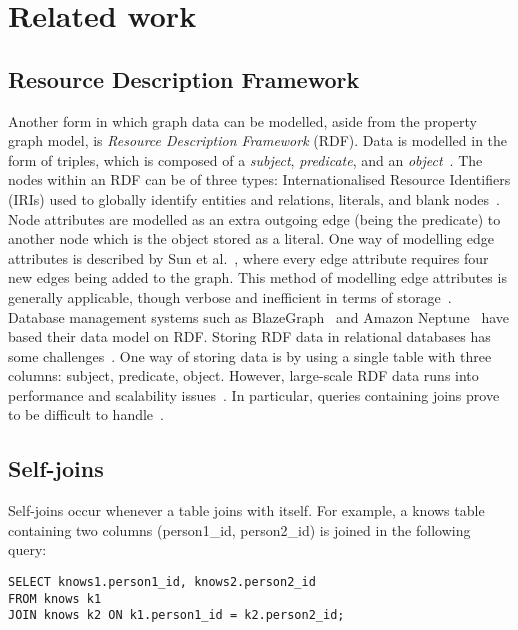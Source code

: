 \section{Related work}
\subsection{Resource Description Framework}
Another form in which graph data can be modelled, aside from the property graph model, is \textit{Resource Description Framework} (RDF). 
Data is modelled in the form of triples, which is composed of a \textit{subject}, \textit{predicate}, and an \textit{object}~\cite{w3rdf}.
The nodes within an RDF can be of three types: Internationalised Resource Identifiers (IRIs) used to globally identify entities and relations, literals, and blank nodes~\cite{10.1145/3447772}.
Node attributes are modelled as an extra outgoing edge (being the predicate) to another node which is the object stored as a literal. 
One way of modelling edge attributes is described by Sun et al.~\cite{DBLP:conf/sigmod/SunFSKHX15}, where every edge attribute requires four new edges being added to the graph.
This method of modelling edge attributes is generally applicable, though verbose and inefficient in terms of storage~\cite{DBLP:conf/sigmod/SunFSKHX15}. 
Database management systems such as BlazeGraph~\cite{blazegraph} and Amazon Neptune~\cite{amazonneptune} have based their data model on RDF. 
Storing RDF data in relational databases has some challenges~\cite{DBLP:conf/sigmod/BorneaDKSDUB13}. 
One way of storing data is by using a single table with three columns: subject, predicate, object. However, large-scale RDF data runs into performance and scalability issues~\cite{DBLP:journals/vldb/NeumannW10}.
In particular, queries containing joins prove to be difficult to handle~\cite{DBLP:journals/vldb/NeumannW10, DBLP:journals/pvldb/Ozsu19}.
\subsection{Self-joins}
Self-joins occur whenever a table joins with itself. For example, a knows table containing two columns (person1\_id, person2\_id) is joined in the following query: 
\begin{lstlisting}[caption=Self-join on the knows table, label=app:selfjoinknows] 
SELECT knows1.person1_id, knows2.person2_id 
FROM knows k1
JOIN knows k2 ON k1.person1_id = k2.person2_id;
\end{lstlisting}

